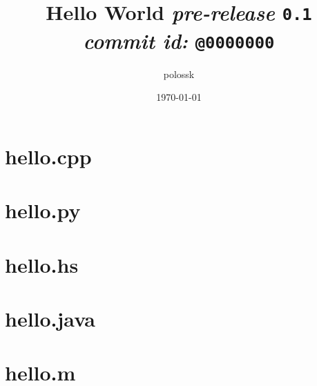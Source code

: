 \documentclass{article}
\title{\textbf{Hello World}
\textit{pre-release}
\texttt{0.1} \\
\textit{commit id:}
\texttt{@0000000}}
\author{polossk}
\date{\today}
\begin{document}
\maketitle
\small\tableofcontents
\thispagestyle{fancy}
\renewcommand{\baselinestretch}{1.25}
\fSong\normalsize

\section{hello.cpp}

\section{hello.py}

\section{hello.hs}

\section{hello.java}

\section{hello.m}

\end{document}
